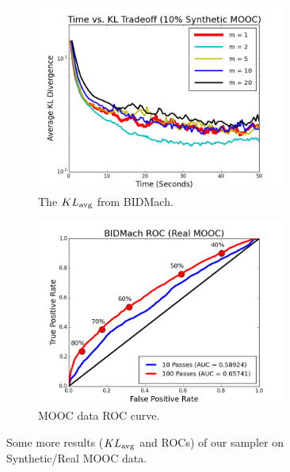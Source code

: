\documentclass{article} %
\begin{document}
\begin{figure}[t]
\centering
\begin{subfigure}{.5\textwidth}
  \centering
  \includegraphics[width=0.9\textwidth]{fig_kltime_tradeoff_mooc}
  \caption{The $KL_{\rm avg}$ from BIDMach.}
  \label{fig:mooc_kl}
\end{subfigure}%
\begin{subfigure}{.5\textwidth}
  \centering
  \includegraphics[width=0.9\textwidth]{fig_bidmach_real_mooc_roc_curve_v2}
  \caption{MOOC data ROC curve.}
  \label{fig:mooc_accuracy}
\end{subfigure}
\caption{Some more results ($KL_{\rm avg}$ and ROCs) of our sampler on Synthetic/Real MOOC data.}
\label{fig:third_set}
\end{figure}
\end{document}
